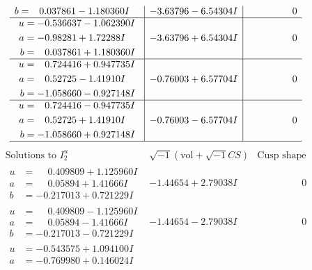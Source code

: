 \documentclass[1p]{elsarticle_modified}
\theoremstyle{definition}
\newcommand{\I}{\sqrt{-1}}
\begin{document}
$$\begin{array}{c|c|c}
\begin{aligned}
b &= \phantom{-}0.037861 - 1.180360 I\end{aligned}
 & -3.63796 - 6.54304 I & \phantom{-0.000000 } 0 \\ \hline\begin{aligned}
u &= -0.536637 - 1.062390 I \\
a &= -0.98281 + 1.72288 I \\
b &= \phantom{-}0.037861 + 1.180360 I\end{aligned}
 & -3.63796 + 6.54304 I & \phantom{-0.000000 } 0 \\ \hline\begin{aligned}
u &= \phantom{-}0.724416 + 0.947735 I \\
a &= \phantom{-}0.52725 - 1.41910 I \\
b &= -1.058660 - 0.927148 I\end{aligned}
 & -0.76003 + 6.57704 I & \phantom{-0.000000 } 0 \\ \hline\begin{aligned}
u &= \phantom{-}0.724416 - 0.947735 I \\
a &= \phantom{-}0.52725 + 1.41910 I \\
b &= -1.058660 + 0.927148 I\end{aligned}
 & -0.76003 - 6.57704 I & \phantom{-0.000000 } 0\\
 \hline 
 \end{array}$$\newpage$$\begin{array}{c|c|c}  
\text{Solutions to }I^u_{2}& \I (\text{vol} + \sqrt{-1}CS) & \text{Cusp shape}\\
 \hline 
\begin{aligned}
u &= \phantom{-}0.409809 + 1.125960 I \\
a &= \phantom{-}0.05894 + 1.41666 I \\
b &= -0.217013 + 0.721229 I\end{aligned}
 & -1.44654 + 2.79038 I & \phantom{-0.000000 } 0 \\ \hline\begin{aligned}
u &= \phantom{-}0.409809 - 1.125960 I \\
a &= \phantom{-}0.05894 - 1.41666 I \\
b &= -0.217013 - 0.721229 I\end{aligned}
 & -1.44654 - 2.79038 I & \phantom{-0.000000 } 0 \\ \hline\begin{aligned}
u &= -0.543575 + 1.094100 I \\
a &= -0.769980 + 0.146024 I \\

\end{aligned}
\end{array}$$
\end{document}
